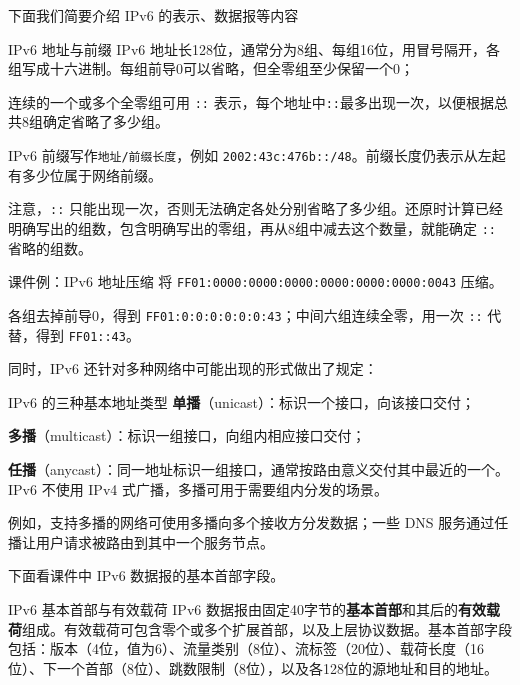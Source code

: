 下面我们简要介绍 IPv6 的表示、数据报等内容
\begin{definition}{IPv6 地址与前缀}
IPv6 地址长128位，通常分为8组、每组16位，用冒号隔开，各组写成十六进制。每组前导0可以省略，但全零组至少保留一个0；

连续的一个或多个全零组可用 \texttt{::} 表示，每个地址中\texttt{::}最多出现一次，以便根据总共8组确定省略了多少组。

IPv6 前缀写作\texttt{地址/前缀长度}，例如 \texttt{2002:43c:476b::/48}。前缀长度仍表示从左起有多少位属于网络前缀。
\end{definition}
\begin{remark}
注意，\texttt{::} 只能出现一次，否则无法确定各处分别省略了多少组。还原时计算已经明确写出的组数，包含明确写出的零组，再从8组中减去这个数量，就能确定 \texttt{::} 省略的组数。
\end{remark}

\begin{example}{课件例：IPv6 地址压缩}
将 \texttt{FF01:0000:0000:0000:0000:0000:0000:0043} 压缩。
\end{example}
\begin{solution}
各组去掉前导0，得到 \texttt{FF01:0:0:0:0:0:0:43}；中间六组连续全零，用一次 \texttt{::} 代替，得到 \texttt{FF01::43}。
\end{solution}

同时，IPv6 还针对多种网络中可能出现的形式做出了规定：

\begin{definition}{IPv6 的三种基本地址类型}
\textbf{单播}（unicast）：标识一个接口，向该接口交付；

\textbf{多播}（multicast）：标识一组接口，向组内相应接口交付；

\textbf{任播}（anycast）：同一地址标识一组接口，通常按路由意义交付其中最近的一个。IPv6 不使用 IPv4 式广播，多播可用于需要组内分发的场景。
\end{definition}
\begin{remark}
例如，支持多播的网络可使用多播向多个接收方分发数据；一些 DNS 服务通过任播让用户请求被路由到其中一个服务节点。
\end{remark}

下面看课件中 IPv6 数据报的基本首部字段。

\begin{definition}{IPv6 基本首部与有效载荷}
IPv6 数据报由固定40字节的\textbf{基本首部}和其后的\textbf{有效载荷}组成。有效载荷可包含零个或多个扩展首部，以及上层协议数据。基本首部字段包括：版本（4位，值为6）、流量类别（8位）、流标签（20位）、载荷长度（16位）、下一个首部（8位）、跳数限制（8位），以及各128位的源地址和目的地址。
\end{definition}

